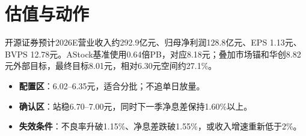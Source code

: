 \section{估值与动作}

开源证券预计2026E营业收入约292.9亿元、归母净利润128.8亿元、EPS 1.13元、BVPS 12.78元。AStock基准使用0.64倍PB，对应8.18元；叠加市场锚和华创8.82元外部目标，最终目标8.01元，相对6.30元空间约27.1\%。

\begin{itemize}
  \item \textbf{配置区}：6.02--6.35元，适合分批；不追单日放量。
  \item \textbf{确认区}：站稳6.70--7.00元，同时下一季净息差保持1.60\%以上。
  \item \textbf{失效条件}：不良率升破1.15\%、净息差跌破1.55\%，或收入增速重新低于2\%。
\end{itemize}
